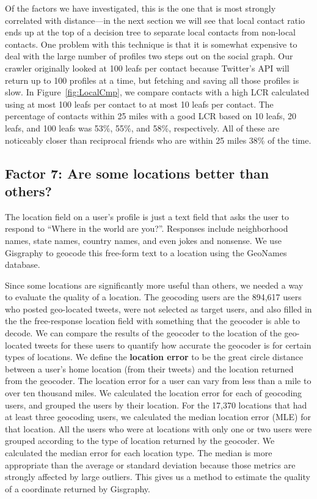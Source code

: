 \documentclass{sig-alternate}
\begin{document}
Of the factors we have investigated, this is the one that is most strongly
correlated with distance---in the next section we will see that local contact
ratio ends up at the top of a decision tree to separate local contacts from
non-local contacts.
%
One problem with this technique is that it is somewhat expensive to deal with
the large number of profiles two steps out on the social graph.
%
Our crawler originally looked at 100 leafs per contact because Twitter's API
will return up to 100 profiles at a time, but fetching and saving all those
profiles is slow.
%
In Figure~\ref{fig:LocalCmp}, we compare contacts with a high LCR calculated
using at most 100 leafs per contact to at most 10 leafs per contact.
%
The percentage of contacts within 25 miles with a good LCR based on 10 leafs,
20 leafs, and 100 leafs was 53\%, 55\%, and 58\%, respectively.
%
All of these are noticeably closer than reciprocal friends who are within 25
miles 38\% of the time.


\subsection{Factor 7: Are some locations better than others?}
The location field on a user's profile is just a text field that asks the user
to respond to ``Where in the world are you?''.
%
Responses include neighborhood names, state names, country names, and even
jokes and nonsense.
%
We use Gisgraphy
to geocode this free-form text to a location using the GeoNames database.

Since some locations are significantly more useful than others, we needed a way
to evaluate the quality of a location.
%
The geocoding users are the 894,617 users who posted geo-located tweets, were not
selected as target users, and also filled in the the free-response location
field with something that the geocoder is able to decode.
%
We can compare the results of the geocoder to the location of the geo-located
tweets for these users to quantify how accurate the geocoder is for certain
types of locations.
%
We define the \textbf{location error} to be the great circle distance between a
user's home location (from their tweets) and the location returned from the geocoder.
The location error for a user can vary from less than a mile to over ten
thousand miles.
%
We calculated the location error for each of geocoding users, and grouped the
users by their location.
%
For the 17,370 locations that had at least three geocoding users, we calculated
the median location error (MLE) for that location.
%
All the users who were at locations with only one or two users were grouped
according to the type of location returned by the geocoder.
%
We calculated the median error for each location type.
%
The median is more appropriate than the average or standard deviation because
those metrics are strongly affected by large outliers.
%
%
This gives us a method to estimate the quality of a coordinate returned by
Gisgraphy.
\end{document}
